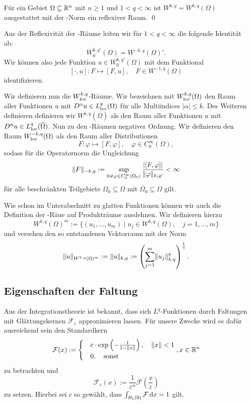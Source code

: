 \begin{lem}
  Für ein Gebiet $\Omega \subseteq \mathbb{R}^n$ mit $n \geq 1$ und $1 < q < \infty$ ist $W^{k,q} = W^{k,q}(\Omega)$ ausgestattet mit der \sobolev\hyp{}Norm ein reflexiver Raum. \qed
\end{lem}

Aus der Reflexivität der \sobolev\hyp{}Räume leiten wir für $1 < q < \infty$ die folgende Identität ab:
$$
  W_0^{k,q'}(\Omega) = W^{-k,q}(\Omega)'.
$$
Wir können also jede Funktion $u \in W_0^{k,q'}(\Omega)$ mit dem Funktional
$$
[\cdot, u] \colon F \mapsto [F, u], \quad F \in W^{-1,q}(\Omega)
$$
identifizieren.

Wir definieren nun die $W^{k,q}_{\operatorname{loc}}$\hyp{}Räume.
Wir bezeichnen mit $W^{k,q}_{\operatorname{loc}}(\Omega)$ den Raum aller Funktionen $u$ mit $D^\alpha u \in L^q_{\operatorname{loc}}(\Omega)$ für alle Multiindices $|\alpha| \leq k$.
Des Weiteren definieren definieren wir $W^{k,q}(\overline\Omega)$ als den Raum aller Funktionen $u$ mit $D^\alpha u \in L^q_{\operatorname{loc}}(\overline\Omega)$.
Nun zu den \sobolev\hyp{}Räumen negativer Ordnung. 
Wir definieren den Raum $W^{-k,q}_{\operatorname{loc}}(\Omega)$ als den Raum aller Distributionen
$$
F \colon \varphi \mapsto [F,\varphi], \quad \varphi \in C_0^\infty(\Omega),
$$
sodass für die Operatornorm die Ungleichung
$$
\lVert F \rVert_{-k,q} := \sup_{0 \neq \varphi \in C_0^\infty(\Omega_0)}  \frac{|[F,\varphi]|}{\lVert \varphi \rVert_{k,q'}} < \infty
$$
für alle beschränkten Teilgebiete $\Omega_0 \subseteq \Omega$ mit $\overline\Omega_0 \subseteq \Omega$ gilt.

Wie schon im Unterabschnitt zu glatten Funktionen können wir auch die Definition der \sobolev\hyp{}Räue auf Produkträume ausdehnen. 
Wir definieren hierzu
$$
W^{k,q}(\Omega)^m := \{ (u_1,\dots,u_m) \mid u_j \in W^{k,q}(\Omega), \quad j = 1,\dots, m\}
$$
und versehen den so entstandenen Vektorraum mit der Norm
$$
\lVert u \rVert_{W^{k,q}(\Omega)^m} 
:= \lVert u \rVert_{k,q}
:= \left( \sum_{j = 1}^m \lVert u_j \rVert_{k,q}^q \right)^{\frac{1}{q}}.
$$


\subsection{Eigenschaften der Faltung}
\label{subsec:mollification}

Aus der Integrationstheorie ist bekannt, dass sich $L^q$-Funktionen durch Faltungen mit Glättungskernen $\mathcal{F}_\varepsilon$ approximieren lassen.
Für unsere Zwecke wird es dafür ausreichend sein den Standardkern
$$
\mathcal{F}(x) := \begin{cases}
                     & c \cdot \exp\left(-\frac{1}{1 - \lVert x \rVert}\right), \quad \lVert x \rVert < 1 \\
                     & 0, \quad  \text{sonst}
                  \end{cases}, x \in \mathbb{R}^n
$$
zu betrachten und
$$
\mathcal{F}_\varepsilon(x) := \frac{1}{\varepsilon^n} \mathcal{F}\left(\frac{x}{\varepsilon}\right)
$$ 
zu setzen.
Hierbei sei $c$ so gewählt, dass $\int_{B_1(0)} \mathcal{F} \, {\operatorname{d}\!{x}} = 1$ gilt.

